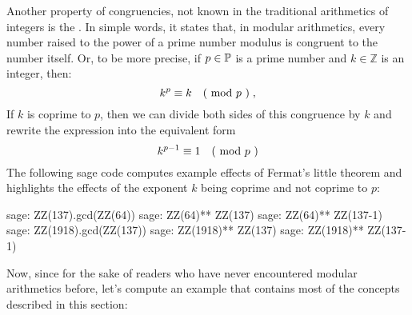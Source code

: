 Another property of congruencies, not known in the traditional arithmetics of integers is the  \label{fermats-little-theorem}. In simple words, it states that, in modular arithmetics, every number raised to the power of a prime number modulus is congruent to the number itself. Or, to be more precise, if $ p \in \mathbb{P} $ is a prime number and $ k \in \mathbb{Z} $ is an integer, then:
\begin{equation}
k ^ p \equiv k \quad \text{( mod } p \text{ )} \;,
\end{equation}
If $k$ is coprime to $p$, then we can divide both sides of this congruence by $k$ and rewrite the expression into the equivalent form 
\begin{equation}
\label{eq_fermat_lt_2}
k ^{p-1} \equiv 1 \quad \text{( mod } p \text{ )}
\end{equation} 
The following sage code computes example effects of Fermat's little theorem and highlights the effects of the exponent $k$ being coprime and not coprime to $p$:
\begin{sagecommandline}
sage: ZZ(137).gcd(ZZ(64))
sage: ZZ(64)** ZZ(137) %
sage: ZZ(64)** ZZ(137-1) %
sage: ZZ(1918).gcd(ZZ(137))
sage: ZZ(1918)** ZZ(137) %
sage: ZZ(1918)** ZZ(137-1) %
\end{sagecommandline}
Now, since for the sake of readers who have never encountered modular arithmetics before, let's compute an example that contains most of the concepts described in this section:   
   

